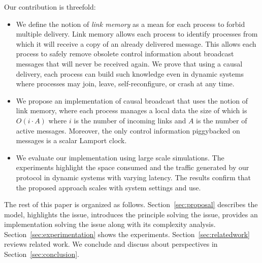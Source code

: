 \noindent Our contribution is threefold:
\begin{itemize}[leftmargin=*]
\item We define the notion of \emph{link memory} as a mean for each process to
  forbid multiple delivery.  Link memory allows each process to identify
  processes from which it will receive a copy of an already delivered
  message. This allows each process to safely remove obsolete control
  information about broadcast messages that will never be received again. We
  prove that using a causal delivery, each process can build such knowledge even
  in dynamic systems where processes may join, leave, self-reconfigure, or crash
  at any time.
\item We propose an implementation of causal broadcast that uses the notion of
  link memory, where each process manages a local data the size of which is
  $O(i \cdot A)$ where $i$ is the number of incoming links and $A$ is the number
  of active messages. Moreover, the only control information piggybacked on
  messages is a scalar Lamport clock.
\item We evaluate our implementation using large scale simulations. The
  experiments highlight the space consumed and the traffic generated by our
  protocol in dynamic systems with varying latency. The results confirm that the
  proposed approach scales with system settings and use.
\end{itemize}

The rest of this paper is organized as follows.  Section~\ref{sec:proposal}
describes the model, highlights the issue, introduces the principle solving the
issue, provides an implementation solving the issue along with its complexity
analysis. Section~\ref{sec:experimentation} shows the
experiments. Section~\ref{sec:relatedwork} reviews related work. We conclude and
discuss about perspectives in Section~\ref{sec:conclusion}.


